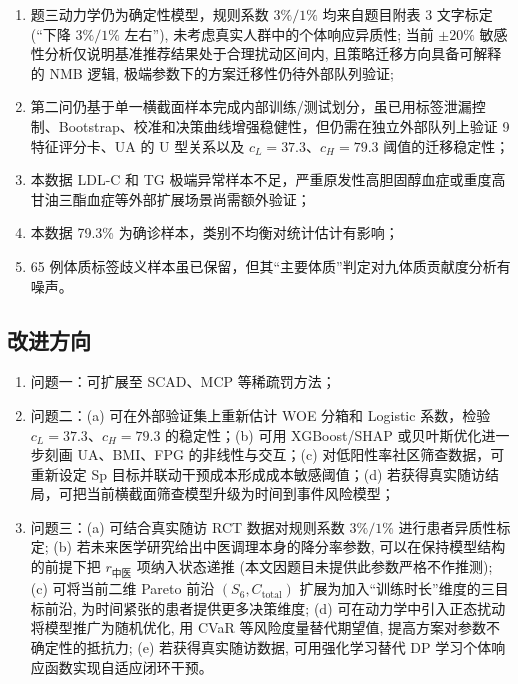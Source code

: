\documentclass{MathorCupmodeling}
\providecommand{\tightlist}{%
  \setlength{\itemsep}{0pt}\setlength{\parskip}{0pt}}
\begin{document}
\begin{enumerate}
\def\labelenumi{(\arabic{enumi})}
\tightlist
\item 题三动力学仍为确定性模型，规则系数 $3\%/1\%$ 均来自题目附表 3 文字标定 (``下降 $3\%/1\%$ 左右''), 未考虑真实人群中的个体响应异质性; 当前 $\pm 20\%$ 敏感性分析仅说明基准推荐结果处于合理扰动区间内, 且策略迁移方向具备可解释的 NMB 逻辑, 极端参数下的方案迁移性仍待外部队列验证;
\item 第二问仍基于单一横截面样本完成内部训练/测试划分，虽已用标签泄漏控制、Bootstrap、校准和决策曲线增强稳健性，但仍需在独立外部队列上验证 9 特征评分卡、UA 的 U 型关系以及 $c_L=37.3$、$c_H=79.3$ 阈值的迁移稳定性；
\item 本数据 LDL-C 和 TG 极端异常样本不足，严重原发性高胆固醇血症或重度高甘油三酯血症等外部扩展场景尚需额外验证；
\item 本数据 79.3\% 为确诊样本，类别不均衡对统计估计有影响；
\item 65 例体质标签歧义样本虽已保留，但其``主要体质''判定对九体质贡献度分析有噪声。
\end{enumerate}

\subsection{改进方向}

\begin{enumerate}
\def\labelenumi{(\arabic{enumi})}
\tightlist
\item 问题一：可扩展至 SCAD、MCP 等稀疏罚方法；
\item 问题二：(a) 可在外部验证集上重新估计 WOE 分箱和 Logistic 系数，检验 $c_L=37.3$、$c_H=79.3$ 的稳定性；(b) 可用 XGBoost/SHAP 或贝叶斯优化进一步刻画 UA、BMI、FPG 的非线性与交互；(c) 对低阳性率社区筛查数据，可重新设定 Sp 目标并联动干预成本形成成本敏感阈值；(d) 若获得真实随访结局，可把当前横截面筛查模型升级为时间到事件风险模型；
\item 问题三：(a) 可结合真实随访 RCT 数据对规则系数 $3\%/1\%$ 进行患者异质性标定; (b) 若未来医学研究给出中医调理本身的降分率参数, 可以在保持模型结构的前提下把 $r_{\text{中医}}$ 项纳入状态递推 (本文因题目未提供此参数严格不作推测); (c) 可将当前二维 Pareto 前沿 $(S_6, C_{\text{total}})$ 扩展为加入``训练时长''维度的三目标前沿, 为时间紧张的患者提供更多决策维度; (d) 可在动力学中引入正态扰动将模型推广为随机优化, 用 CVaR 等风险度量替代期望值, 提高方案对参数不确定性的抵抗力; (e) 若获得真实随访数据, 可用强化学习替代 DP 学习个体响应函数实现自适应闭环干预。
\end{enumerate}
\end{document}
